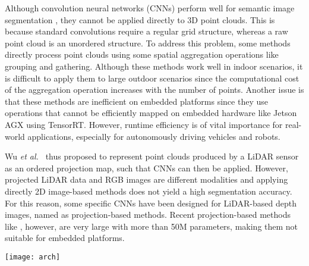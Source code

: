 \documentclass[letterpaper, 10 pt, journal, twoside]{ieeetran}
\newcommand{\figref}[1]{Fig.~\ref{#1}}
\newcommand{\tabref}[1]{Tab.~\ref{#1}}
\def\etal{\textit{et al.~}}
\newcommand{\todo}[1]{#1}
\begin{document}
Although convolution neural networks (CNNs) perform well for semantic image segmentation \cite{chen2017rethinking,zhao2017pyramid,howard2019searching,ma2018shufflenet}, they cannot be applied directly to 3D point clouds.
This is because standard convolutions require a regular grid structure, whereas a raw point cloud is an unordered structure.
To address this problem, some methods
\cite{qi2017pointnet,qi2017pointnet++,wu2019pointconv} directly process point clouds using some spatial aggregation operations like grouping and gathering.
Although these methods work well in indoor scenarios, it is difficult to apply them to large outdoor scenarios since the computational cost of the aggregation operation increases with the number of points. Another issue is that these methods are inefficient on embedded platforms since they use operations that cannot be efficiently mapped on embedded hardware like Jetson AGX using TensorRT. However, runtime efficiency is of vital importance for real-world applications, especially for autonomously driving vehicles and robots. 


Wu \etal\cite{wu2018squeezeseg,wu2019squeezesegv2} thus proposed to represent point clouds produced by a LiDAR sensor as an ordered projection map, such that CNNs can then be applied. However, projected LiDAR data and RGB images are different modalities and applying directly 2D image-based methods does not yield a high segmentation accuracy.   
For this reason, some specific CNNs have been designed for LiDAR-based depth images, named as projection-based methods.
Recent projection-based methods like \cite{milioto2019rangenet++}, however, are very large with more than 50M parameters, making them not suitable for embedded platforms.







\begin{figure*}[t]
    \centering
    \texttt{[image: arch]}
    \caption{\todo{Illustration of the MINet architecture with three paths in the Multi-scale Interaction Module.} The numbers 2 and 4 for interpolation (U) and average pooling (D) indicate the upsampling and downsampling factor. The dashed arrows indicate the supervision type. \todo{The detailed description of the architecture is given in \tabref{tab:instantiation} where the different blocks are illustrated in \figref{fig:blocks} and the Up Fusion Module is illustrated in \figref{fig:ufm}.}}
    \label{fig:arch}
    \vspace{-4mm}
\end{figure*}
\end{document}
